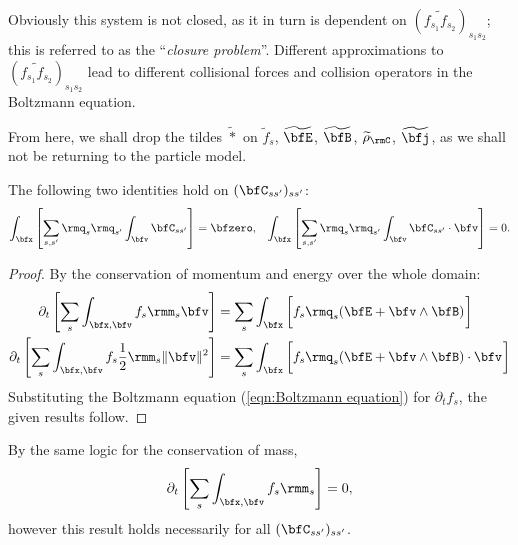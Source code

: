     Obviously this system is not closed, as it in turn is dependent on $\left(\widetilde{f_{s_{1}}f_{s_{2}}}\right)_{s_{1}s_{2}}$; this is referred to as the ``\emph{closure problem}''. Different approximations to $\left(\widetilde{f_{s_{1}}f_{s_{2}}}\right)_{s_{1}s_{2}}$ lead to different collisional forces and collision operators in the Boltzmann equation.

    From here, we shall drop the tildes $\widetilde{*}$ on $\widetilde{f}_{s}$, $\widetilde{\bfE}$, $\widetilde{\bfB}$, $\widetilde{\rho}_{\rmC}$, $\widetilde{\bfj}$, as we shall not be returning to the particle model.

    \line
    
    \begin{lemma}\label{lem:conservation on collision operators}
        The following two identities hold on $(\bfC_{ss'})_{ss'}$:
        \begin{align}
            \int_{\bfx}\left[\sum_{s, s'}\rmq_{s}\rmq_{s'}\int_{\bfv}\bfC_{ss'}\right]           =  \bfzero,  &&
            \int_{\bfx}\left[\sum_{s, s'}\rmq_{s}\rmq_{s'}\int_{\bfv}\bfC_{ss'}\cdot\bfv\right]  =  0.
        \end{align}
    \end{lemma}
    \begin{proof}
        By the conservation of momentum and energy over the whole domain:
        \begin{align}
            \partial_{t}\left[\sum_{s}\int_{\bfx, \bfv}f_{s}\rmm_{s}\bfv\right]                     &=  \sum_{s}\int_{\bfx}\left[f_{s}\rmq_{s}(\bfE + \bfv\wedge\bfB)\tall\right]  \\
            \partial_{t}\left[\sum_{s}\int_{\bfx, \bfv}f_{s}\frac{1}{2}\rmm_{s}\|\bfv\|^{2}\right]  &=  \sum_{s}\int_{\bfx}\left[f_{s}\rmq_{s}(\bfE + \bfv\wedge\bfB)\cdot\bfv\tall\right]
        \end{align}
        Substituting the Boltzmann equation (\ref{eqn:Boltzmann equation}) for $\partial_{t}f_{s}$, the given results follow.

    \end{proof}
    
    \begin{remark}
        By the same logic for the conservation of mass,
        \begin{equation}
            \partial_{t}\left[\sum_{s}\int_{\bfx, \bfv}f_{s}\rmm_{s}\right]  =  0,
        \end{equation}
        however this result holds necessarily for all $(\bfC_{ss'})_{ss'}$.
    \end{remark}
    